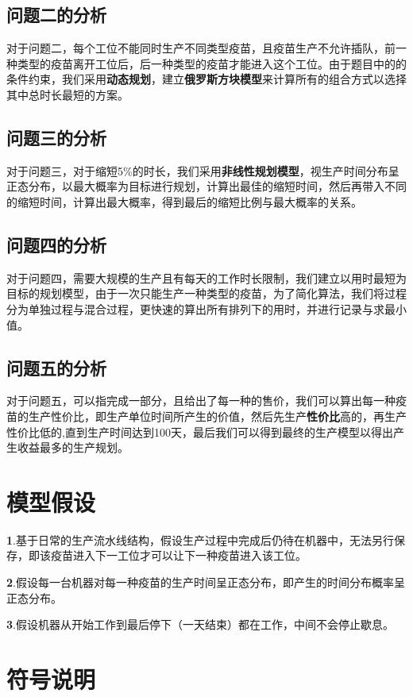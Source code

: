 \documentclass{ctexart}
\begin{document}
\subsection{问题二的分析}
对于问题二，每个工位不能同时生产不同类型疫苗，且疫苗生产不允许插队，前一种类型的疫苗离开工位后，后一种类型的疫苗才能进入这个工位。由于题目中的的条件约束，我们采用\textbf{动态规划\cite{ref2}}，建立\textbf{俄罗斯方块模型}来计算所有的组合方式以选择其中总时长最短的方案。
\subsection{问题三的分析}
对于问题三，对于缩短5\%的时长，我们采用\textbf{非线性规划模型}，视生产时间分布呈正态分布，以最大概率为目标进行规划，计算出最佳的缩短时间，然后再带入不同的缩短时间，计算出最大概率，得到最后的缩短比例与最大概率的关系。
\subsection{问题四的分析}
对于问题四，需要大规模的生产且有每天的工作时长限制，我们建立以用时最短为目标的规划模型，由于一次只能生产一种类型的疫苗，为了简化算法，我们将过程分为单独过程与混合过程，更快速的算出所有排列下的用时，并进行记录与求最小值。
\subsection{问题五的分析}
对于问题五，可以指完成一部分，且给出了每一种的售价，我们可以算出每一种疫苗的生产性价比，即生产单位时间所产生的价值，然后先生产\textbf{性价比}高的，再生产性价比低的,直到生产时间达到100天，最后我们可以得到最终的生产模型\cite{ref1}以得出产生收益最多的生产规划。

\section{模型假设}
\textbf{1}.基于日常的生产流水线结构，假设生产过程中完成后仍待在机器中，无法另行保存，即该疫苗进入下一工位才可以让下一种疫苗进入该工位。\par
\textbf{2}.假设每一台机器对每一种疫苗的生产时间呈正态分布，即产生的时间分布概率呈正态分布。\par
\textbf{3}.假设机器从开始工作到最后停下（一天结束）都在工作，中间不会停止歇息。\par

\section{符号说明}
\end{document}
